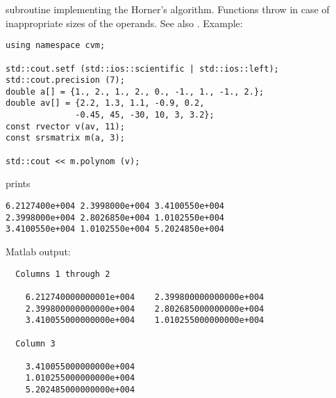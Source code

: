\FORTRAN subroutine implementing the Horner's algorithm.
Functions throw   
in case of inappropriate sizes of the operands.
See also
.
Example:
\begin{Verbatim}
using namespace cvm;

std::cout.setf (std::ios::scientific | std::ios::left); 
std::cout.precision (7);
double a[] = {1., 2., 1., 2., 0., -1., 1., -1., 2.};
double av[] = {2.2, 1.3, 1.1, -0.9, 0.2,
              -0.45, 45, -30, 10, 3, 3.2};
const rvector v(av, 11);
const srsmatrix m(a, 3);

std::cout << m.polynom (v);
\end{Verbatim}
prints
\begin{Verbatim}
6.2127400e+004 2.3998000e+004 3.4100550e+004
2.3998000e+004 2.8026850e+004 1.0102550e+004
3.4100550e+004 1.0102550e+004 5.2024850e+004
\end{Verbatim}
Matlab output:
\begin{Verbatim}
  Columns 1 through 2 

    6.212740000000001e+004    2.399800000000000e+004
    2.399800000000000e+004    2.802685000000000e+004
    3.410055000000000e+004    1.010255000000000e+004

  Column 3 

    3.410055000000000e+004
    1.010255000000000e+004
    5.202485000000000e+004
\end{Verbatim}
\newpage





